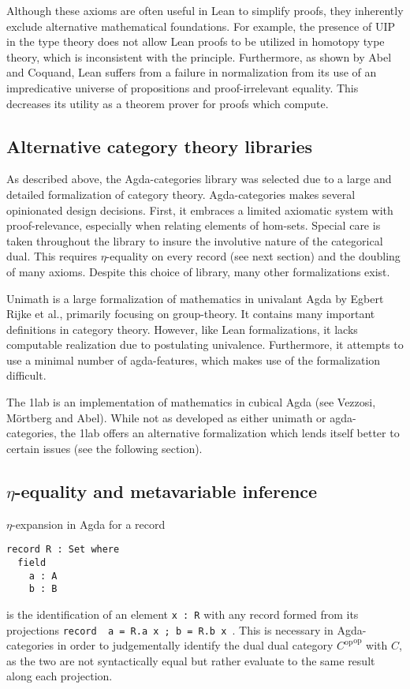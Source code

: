 \documentclass{amsart}
\theoremstyle{remark}
\DeclareMathOperator{\op}{op}
\begin{document}
Although these axioms are often useful in Lean to simplify proofs, they inherently exclude alternative mathematical foundations. For example, the presence of UIP in the type theory does not allow Lean proofs to be utilized in homotopy type theory, which is inconsistent with the principle\cite{hottbook}. Furthermore, as shown by Abel and Coquand\cite{lean-normalization}, Lean suffers from a failure in normalization from its use of an impredicative universe of propositions and proof-irrelevant equality. This decreases its utility as a theorem prover for proofs which compute.

\subsection{Alternative category theory libraries}

As described above, the Agda-categories\cite{agda:categories} library was selected due to a large and detailed formalization of category theory. Agda-categories makes several opinionated design decisions. First, it embraces a limited axiomatic system with proof-relevance, especially when relating elements of hom-sets. Special care is taken throughout the library to insure the involutive nature of the categorical dual. This requires $\eta$-equality on every record (see next section) and the doubling of many axioms.
Despite this choice of library, many other formalizations exist.

Unimath\cite{agda:unimath} is a large formalization of mathematics in univalant Agda by Egbert Rijke et al., primarily focusing on group-theory. It contains many important definitions in category theory. However, like Lean formalizations, it lacks computable realization due to postulating univalence. Furthermore, it attempts to use a minimal number of agda-features, which makes use of the formalization difficult.

The 1lab\cite{agda:1lab} is an implementation of mathematics in cubical Agda (see Vezzosi, M\"{o}rtberg and Abel\cite{agda:cubical}). While not as developed as either unimath or agda-categories, the 1lab offers an alternative formalization which lends itself better to certain issues (see the following section).

\subsection{\texorpdfstring{$\eta$}{eta}-equality and metavariable inference}
$\eta$-expansion in Agda for a record
\begin{verbatim}
record R : Set where
  field
    a : A
    b : B
\end{verbatim}
is the identification of an element \texttt{x : R} with any record formed from its projections \texttt{record { a = R.a x ; b = R.b x }}. This is necessary in Agda-categories in order to judgementally identify the dual dual category ${C^{\op}}^{\op}$ with $C$, as the two are not syntactically equal but rather evaluate to the same result along each projection.
\end{document}
